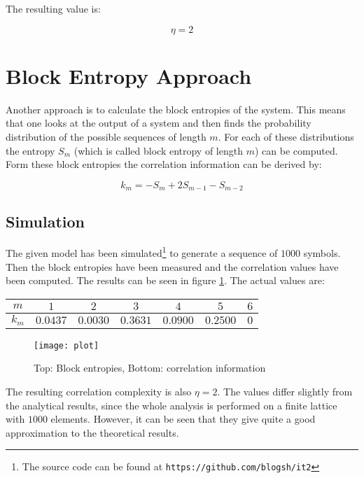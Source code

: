 \documentclass[12pt]{scrartcl}
\begin{document}
The resulting value is:

\begin{equation}
\eta = 2
\end{equation}

\section{Block Entropy Approach}

Another approach is to calculate the block entropies of the system. This means that one looks at the output of a system and then finds the probability distribution of the possible sequences of length $m$. For each of these distributions the entropy $S_m$ (which is called block entropy of length $m$) can be computed. Form these block entropies the correlation information can be derived by:

\begin{equation}
k_m = -S_{m} + 2 S_{m-1} - S_{m-2}
\end{equation}

\subsection{Simulation}

The given model has been simulated\footnote{
The source code can be found at \texttt{https://github.com/blogsh/it2}} to generate a sequence of $1000$ symbols. Then the block entropies have been measured and the correlation values have been computed. The results can be seen in figure \ref{fig:plot}. The actual values are:

\begin{table}[!h]
\centering
\begin{tabular}{c||c|c|c|c|c|c}
$m$ & $1$ & $2$ & $3$ & $4$ & $5$ & $6$\\ \hline
$k_m$ & $0.0437$ & $0.0030$ & $0.3631$ & $0.0900$ & $0.2500$ & $0$
\end{tabular}
\end{table}

\begin{figure}
\centering
\texttt{[image: plot]}
\caption{Top: Block entropies, Bottom: correlation information}
\label{fig:plot}
\end{figure}

The resulting correlation complexity is also $\eta = 2$. The values differ slightly from the analytical results, since the whole analysis is performed on a finite lattice with $1000$ elements. However, it can be seen that they give quite a good approximation to the theoretical results.
\end{document}
